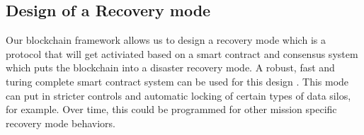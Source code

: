 \subsection{Design of a Recovery mode}

Our blockchain framework allows us to design a recovery mode which is a protocol that will get activiated based on a 
smart contract and consensus system which puts the blockchain into a disaster recovery mode. A robust, fast and turing
complete smart contract system can be used for this design \cite{kalodner2018}. This mode can put in 
stricter controls and automatic locking of certain types of data silos, for example. Over time, this could be programmed
for other mission specific recovery mode behaviors.
